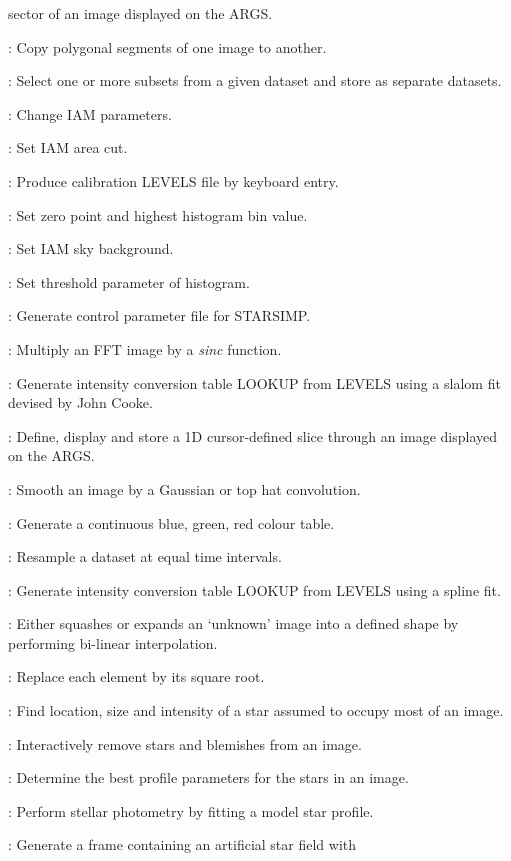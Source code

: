 \begin{description}
sector of an image displayed on the ARGS.
\item [SEGMENT]: Copy polygonal segments of one image to another.
\item [SELECT]: Select one or more subsets from a given dataset and store as
separate datasets.
\item [SETALL*]:  Change IAM parameters.
\item [SETAREA*]: Set IAM area cut.
\item [SETLEV]: Produce calibration LEVELS file by keyboard entry.
\item [SETLIM*]: Set zero point and highest histogram bin value.
\item [SETMAG*]: Set IAM sky background.
\item [SETPER*]: Set threshold parameter of histogram.
\item [SIMPAR]: Generate control parameter file for STARSIMP.
\item [SINCFIL*]: Multiply an FFT image by a {\em sinc} function.
\item [SLAFIT]: Generate intensity conversion table LOOKUP from LEVELS using
a slalom fit devised by John Cooke.
\item [SLICE]: Define, display and store a 1D cursor-defined slice through an
image displayed on the ARGS.
\item [SMOOTH]: Smooth an image by a Gaussian or top hat convolution.
\item [SPECOL]: Generate a continuous blue, green, red colour table.
\item [SPLEQ]: Resample a dataset at equal time intervals.
\item [SPLFIT]: Generate intensity conversion table LOOKUP from LEVELS using a
spline fit.
\item [SQORST]: Either squashes or expands an `unknown' image into a defined
shape by performing bi-linear interpolation.
\item [SQRT]: Replace each element by its square root.
\item [STAR]: Find location, size and intensity of a star assumed to occupy
most of an image.
\item [STAREMASP]: Interactively remove stars and blemishes from an image.
\item [STARFIT]: Determine the best profile parameters for the stars in an
image.
\item [STARMAG]: Perform stellar photometry by fitting a model star profile.
\item [STARSIM*]: Generate a frame containing  an artificial star field with

\end{description}

